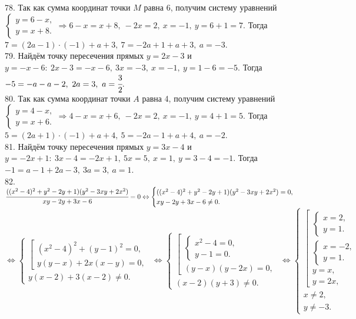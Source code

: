 \documentclass[12pt]{article}
\begin{document}
78. Так как сумма координат точки $M$ равна 6, получим систему уравнений $\begin{cases} y=6-x,\\ y=x+8.\end{cases}\Rightarrow 6-x=x+8,\ -2x=2,\ x=-1,\ y=6+1=7.$ Тогда $7=(2a-1)\cdot(-1)+a+3,\ 7=-2a+1+a+3,\ a=-3.$\\
79. Найдём точку пересечения прямых $y=2x-3$ и $y=-x-6:\ 2x-3=-x-6,\ 3x=-3,\ x=-1,\ y=1-6=-5.$ Тогда $-5=-a-a-2,\ 2a=3,\ a=\cfrac{3}{2}.$\\
80. Так как сумма координат точки $A$ равна 4, получим систему уравнений $\begin{cases} y=4-x,\\ y=x+6.\end{cases}\Rightarrow 4-x=x+6,\ -2x=2,\ x=-1,\ y=4+1=5.$ Тогда $5=(2a+1)\cdot(-1)+a+4,\ 5=-2a-1+a+4,\ a=-2.$\\
81. Найдём точку пересечения прямых $y=3x-4$ и $y=-2x+1:\ 3x-4=-2x+1,\ 5x=5,\ x=1,\ y=3-4=-1.$ Тогда $-1=a-1+2a-3,\ 3a=3,\ a=1.$\\
82. $\cfrac{((x^2-4)^2+y^2-2y+1)(y^2-3xy+2x^2)}{xy-2y+3x-6}=0\Leftrightarrow
\begin{cases}

((x^2-4)^2+y^2-2y+1)(y^2-3xy+2x^2)=0,\\
xy-2y+3x-6\neq0.
\end{cases}$\\$\Leftrightarrow
\begin{cases}
\left[\begin{array}{l}
(x^2-4)^2+(y-1)^2=0,\\
y(y-x)+2x(x-y)=0,
\end{array}\right.\\
y(x-2)+3(x-2)\neq0.
\end{cases}\Leftrightarrow
\begin{cases}
\left[\begin{array}{l}
\begin{cases}
x^2-4=0,\\
y-1=0.
\end{cases}\\
(y-x)(y-2x)=0,
\end{array}\right.\\
(x-2)(y+3)\neq0.
\end{cases}\Leftrightarrow
\begin{cases}
\left[\begin{array}{l}
\begin{cases}
x=2,\\
y=1.
\end{cases}\\
\begin{cases}
x=-2,\\
y=1.
\end{cases}\\
y=x,\\
y=2x,
\end{array}\right.\\
x\neq2,\\
y\neq-3.
\end{cases}$
\end{document}
